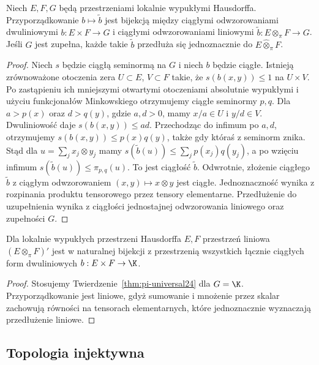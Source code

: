 \begin{twierdzenie}
\label{thm:pi-universal24}
Niech $E,F,G$ będą przestrzeniami lokalnie wypukłymi
Hausdorffa. Przyporządkowanie $b\mapsto\widetilde b$ jest bijekcją
między ciągłymi odwzorowaniami dwuliniowymi
$b:E\times F\to G$ i ciągłymi odwzorowaniami liniowymi
$\widetilde b:E\otimes_\pi F\to G$. Jeśli $G$ jest
zupełna, każde takie $\widetilde b$ przedłuża się jednoznacznie
do $E\widehat\otimes_\pi F$.
\end{twierdzenie}
\begin{proof}
Niech $s$ będzie ciągłą seminormą na $G$ i niech $b$
będzie ciągłe. Istnieją zrównoważone otoczenia zera
$U\subset E$, $V\subset F$ takie, że $s(b(x,y))\le1$
na $U\times V$. Po zastąpieniu ich mniejszymi otwartymi
otoczeniami absolutnie wypukłymi i użyciu funkcjonałów
Minkowskiego otrzymujemy ciągłe seminormy $p,q$.
Dla $a>p(x)$ oraz $d>q(y)$, gdzie $a,d>0$,
mamy $x/a\in U$ i $y/d\in V$.
Dwuliniowość daje $s(b(x,y))\le ad$.
Przechodząc do infimum po $a,d$, otrzymujemy
$s(b(x,y))\le p(x)q(y)$, także gdy któraś
z seminorm znika. Stąd dla $u=\sum_jx_j\otimes y_j$ mamy
$s(\widetilde b(u))\le\sum_jp(x_j)q(y_j)$,
a po wzięciu infimum $s(\widetilde b(u))\le\pi_{p,q}(u)$.
To jest ciągłość $\widetilde b$. Odwrotnie, złożenie
ciągłego $\widetilde b$ z ciągłym odwzorowaniem
$(x,y)\mapsto x\otimes y$ jest ciągłe.
Jednoznaczność wynika z rozpinania produktu tensorowego
przez tensory elementarne. Przedłużenie do uzupełnienia
wynika z ciągłości jednostajnej odwzorowania liniowego
oraz zupełności $G$.
\end{proof}

\begin{wniosek}
\label{cor:pi-dual24}
Dla lokalnie wypukłych przestrzeni Hausdorffa $E,F$
przestrzeń liniowa $(E\otimes_\pi F)'$ jest w naturalnej
bijekcji z przestrzenią wszystkich łącznie ciągłych form
dwuliniowych $b:E\times F\to\K$.
\end{wniosek}
\begin{proof}
Stosujemy Twierdzenie~\ref{thm:pi-universal24} dla
$G=\K$. Przyporządkowanie jest liniowe, gdyż
sumowanie i mnożenie przez skalar zachowują
równości na tensorach elementarnych, które
jednoznacznie wyznaczają przedłużenie liniowe.
\end{proof}

\subsection{Topologia injektywna}

